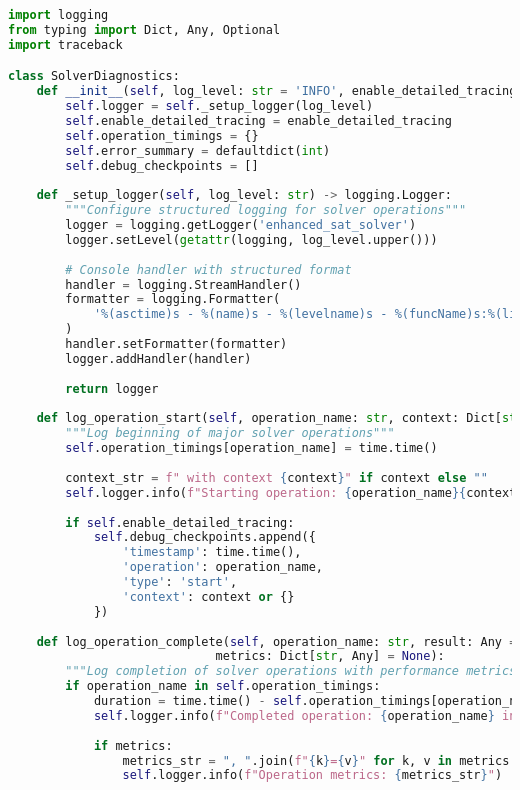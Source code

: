 \begin{lstlisting}[language=Python, caption=Diagnostic Logging and Debug Infrastructure]
import logging
from typing import Dict, Any, Optional
import traceback

class SolverDiagnostics:
    def __init__(self, log_level: str = 'INFO', enable_detailed_tracing: bool = False):
        self.logger = self._setup_logger(log_level)
        self.enable_detailed_tracing = enable_detailed_tracing
        self.operation_timings = {}
        self.error_summary = defaultdict(int)
        self.debug_checkpoints = []
    
    def _setup_logger(self, log_level: str) -> logging.Logger:
        """Configure structured logging for solver operations"""
        logger = logging.getLogger('enhanced_sat_solver')
        logger.setLevel(getattr(logging, log_level.upper()))
        
        # Console handler with structured format
        handler = logging.StreamHandler()
        formatter = logging.Formatter(
            '%(asctime)s - %(name)s - %(levelname)s - %(funcName)s:%(lineno)d - %(message)s'
        )
        handler.setFormatter(formatter)
        logger.addHandler(handler)
        
        return logger
    
    def log_operation_start(self, operation_name: str, context: Dict[str, Any] = None):
        """Log beginning of major solver operations"""
        self.operation_timings[operation_name] = time.time()
        
        context_str = f" with context {context}" if context else ""
        self.logger.info(f"Starting operation: {operation_name}{context_str}")
        
        if self.enable_detailed_tracing:
            self.debug_checkpoints.append({
                'timestamp': time.time(),
                'operation': operation_name,
                'type': 'start',
                'context': context or {}
            })
    
    def log_operation_complete(self, operation_name: str, result: Any = None, 
                             metrics: Dict[str, Any] = None):
        """Log completion of solver operations with performance metrics"""
        if operation_name in self.operation_timings:
            duration = time.time() - self.operation_timings[operation_name]
            self.logger.info(f"Completed operation: {operation_name} in {duration:.4f}s")
            
            if metrics:
                metrics_str = ", ".join(f"{k}={v}" for k, v in metrics.items())
                self.logger.info(f"Operation metrics: {metrics_str}")
        

\end{lstlisting}
